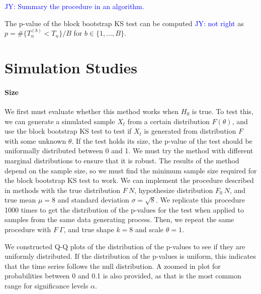 \documentclass[12pt, letterpaper]{article}
\newcommand{\jy}[1]{\textcolor{blue}{JY: #1}}
\begin{document}
\jy{Summary the procedure in an algorithm.}

The p-value of the block bootstrap KS test can be computed
\jy{not right}
as $p = \#\{T^{(b)}_n < T_n\} / B$ for 
$b \in \{1, \ldots, B\}$.

\section{Simulation Studies}
\label{sec:simu}

\paragraph{Size}
We first must evaluate whether this method works when $H_0$ is true. To
test this, we can
generate a simulated sample $X_t$ from a certain distribution $F(\theta)$,
and use the block bootstrap KS test to test if $X_t$ is generated from 
distribution $F$ with some unknown $\theta$. If the test holds its size, the 
p-value
of the test should be uniformally distributed between 0 and 1. We must try the
method with different marginal distributions to ensure that it is robust.
The results of the method depend on the sample size, so we must find the minimum
sample size required for the block bootstrap KS test to work.
We can implement the procedure described in methods with the true distribution
$F ~ N$, hypothesize distribution $F_0 ~ N$, and true mean $\mu = 8$ and 
standard deviation $\sigma = \sqrt{8}$.
We replicate this procedure 1000 times to get the distribution of the p-values 
for the test when applied to samples from the same data generating process.
Then, we repeat the same procedure with $F ~ \Gamma$, and true shape $k = 8$ and
scale $\theta = 1$.

We constructed Q-Q plots of the distribution of the p-values to see if they are
uniformly distributed. If the distribution of the p-values is uniform, this 
indicates that the time series follows the null distribution. 
A zoomed in plot for probabilities between 0 and 0.1 is
also provided, as
that is the most common range for significance levels $\alpha$. 
\end{document}
